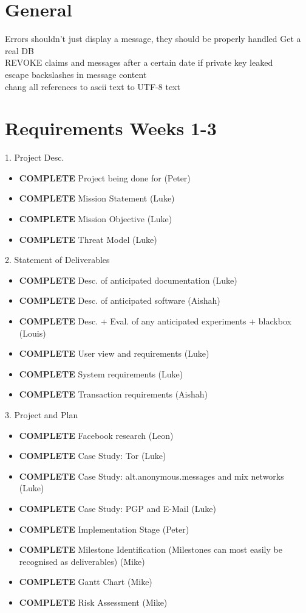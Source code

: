 \section{General}
Errors shouldn't just display a message, they should be properly handled
Get a real DB\\
REVOKE claims and messages after a certain date if private key leaked\\
escape backslashes in message content\\
chang all references to ascii text to UTF-8 text\\

\section{Requirements \textbf{Weeks 1-3}}
1. Project Desc.
\begin{itemize}
\item \textbf{COMPLETE} Project being done for (Peter)
\item \textbf{COMPLETE} Mission Statement (Luke)
\item \textbf{COMPLETE} Mission Objective (Luke)
\item \textbf{COMPLETE} Threat Model (Luke)
\end{itemize}

2. Statement of Deliverables
\begin{itemize}
\item \textbf{COMPLETE}    Desc. of anticipated documentation (Luke)
\item \textbf{COMPLETE}    Desc. of anticipated software (Aishah)
\item \textbf{COMPLETE}    Desc. + Eval. of any anticipated experiments + blackbox (Louis)
\item \textbf{COMPLETE}    User view and requirements (Luke)
\item \textbf{COMPLETE}    System requirements (Luke)
\item \textbf{COMPLETE}    Transaction requirements (Aishah)
\end{itemize}

3. Project and Plan
\begin{itemize}
\item \textbf{COMPLETE}    Facebook research (Leon)
\item \textbf{COMPLETE}    Case Study: Tor (Luke)
\item \textbf{COMPLETE}    Case Study: alt.anonymous.messages and mix networks (Luke)
\item \textbf{COMPLETE}    Case Study: PGP and E-Mail (Luke)
\item \textbf{COMPLETE}    Implementation Stage (Peter)
\item \textbf{COMPLETE}    Milestone Identification (Milestones can most easily be recognised as deliverables) (Mike)
\item \textbf{COMPLETE}    Gantt Chart (Mike)
\item \textbf{COMPLETE}    Risk Assessment (Mike)
\end{itemize}

